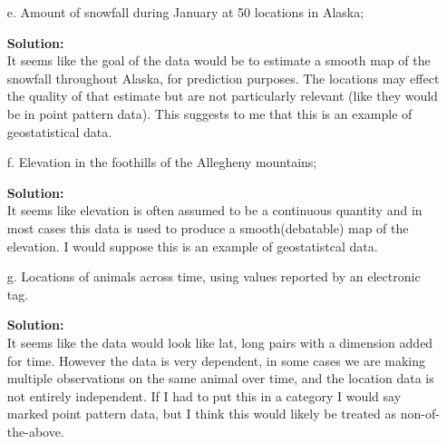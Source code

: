 \documentclass[12pt]{article}
\makeatletter
\theoremstyle{homework}
\newenvironment{exercise}[1]
{\def\@currentlabel{#1}\exercisecore}
{\endexercisecore}
\newcommand{\localhead}[1]{\par\smallskip\noindent\textbf{#1}\nobreak\\}%
\newcommand\solution{\localhead{Solution:}}
\makeatother
\begin{document}
\begin{exercise}{1}
\begin{enumerate}
        \item[e.] Amount of snowfall during January at 50 locations in Alaska;\\
        \solution  It seems like the goal of the data would be to estimate a smooth map of the snowfall throughout Alaska, for prediction purposes. The locations may effect the quality of 
        that estimate but are not particularly relevant (like they would be in point pattern data). This suggests to me that this is an example of geostatistical data. 
        \vspace{.15in} 
        \item[f.] Elevation in the foothills of the Allegheny mountains;\\
        \solution It seems like elevation is often assumed to be a continuous quantity and in most cases this data is used to produce a smooth(debatable) map of the elevation. I would suppose this 
        is an example of geostatistcal data. 
        \vspace{.15in} 
        \item[g.] Locations of animals across time, using values reported by an electronic tag.\\
        \solution It seems like the data would look like lat, long pairs with a dimension added for time. However the data is very 
        dependent, in some cases we are making multiple observations on the same animal over time, and the location data is not entirely independent. If I had to 
        put this in a category I would say marked point pattern data, but I think this would likely be treated as non-of-the-above. 
    \end{enumerate}
\end{exercise}
\end{document}

